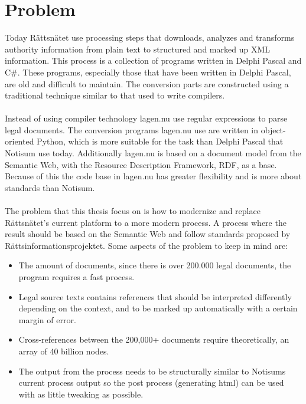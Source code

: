 \section{Problem}
Today Rättsnätet use processing steps that downloads, analyzes and transforms authority information from plain text to structured and marked up XML information. This process is a collection of programs written in Delphi Pascal and C\#. These programs, especially those that have been written in Delphi Pascal, are old and difficult to maintain. The conversion parts are constructed using a traditional technique similar to that used to write compilers.\\\\
Instead of using compiler technology lagen.nu use regular expressions to parse legal documents. The conversion programs lagen.nu use are written in object-oriented Python, which is more suitable for the task than Delphi Pascal that Notisum use today. Additionally lagen.nu is based on a document model from the Semantic Web, with the Resource Description Framework, RDF, as a base. Because of this the code base in lagen.nu has greater flexibility and is more about standards than Notisum.\\\\
The problem that this thesis focus on is how to modernize and replace Rättsnätet's current platform to a more modern process. A process where the result should be based on the Semantic Web and follow standards proposed by Rättsinformationsprojektet. Some aspects of the problem to keep in mind are:
\begin{itemize} 
\item The amount of documents, since there is over 200.000 legal documents, the program requires a fast process.
\item Legal source texts contains references that should be interpreted differently depending on the context, and to be marked up automatically with a certain margin of error.
\item Cross-references between the 200,000+ documents require theoretically, an array of 40 billion nodes.
\item The output from the process needs to be structurally similar to Notisums current process output so the post process (generating html) can be used with as little tweaking as possible.
\end{itemize}

